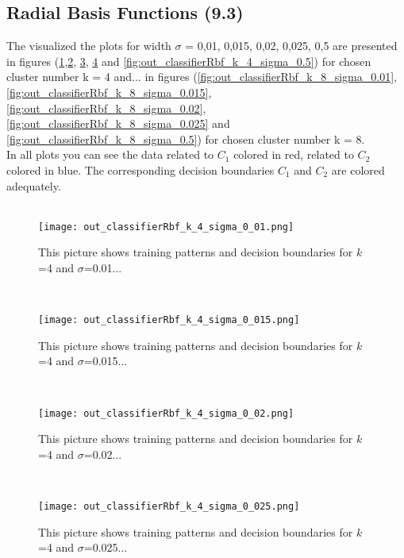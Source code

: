 \documentclass[a4paper,headings=small]{scrartcl}
\begin{document}
\subsection{Radial Basis Functions (9.3)}
The visualized the plots for width $\sigma$ = 0,01, 0,015, 0,02, 0,025, 0,5 are presented in figures (\ref{fig:out_classifierRbf_k_4_sigma_0.01},\ref{fig:out_classifierRbf_k_4_sigma_0.015}, \ref{fig:out_classifierRbf_k_4_sigma_0.02}, \ref{fig:out_classifierRbf_k_4_sigma_0.025} and \ref{fig:out_classifierRbf_k_4_sigma_0.5}) for chosen cluster number k = 4 and... in figures (\ref{fig:out_classifierRbf_k_8_sigma_0.01},\ref{fig:out_classifierRbf_k_8_sigma_0.015}, \ref{fig:out_classifierRbf_k_8_sigma_0.02}, \ref{fig:out_classifierRbf_k_8_sigma_0.025} and \ref{fig:out_classifierRbf_k_8_sigma_0.5}) for chosen cluster number k = 8.\\
In all plots you can see the data related to $C_1$ colored in red, related to $C_2$ colored in blue. The corresponding decision boundaries $C_1$ and $C_2$ are colored adequately.\\ 
\\
\begin{figure}[htbp]
\centering
\texttt{[image: out\_classifierRbf\_k\_4\_sigma\_0\_01.png]}
\caption{This picture shows training patterns and decision boundaries for $k$=4 and $\sigma$=0.01...}
\label{fig:out_classifierRbf_k_4_sigma_0.01}
\end{figure}
\\
\begin{figure}[htbp]
\centering
\texttt{[image: out\_classifierRbf\_k\_4\_sigma\_0\_015.png]}
\caption{This picture shows training patterns and decision boundaries for $k$=4 and $\sigma$=0.015...}
\label{fig:out_classifierRbf_k_4_sigma_0.015}
\end{figure}
\\
\begin{figure}[htbp]
\centering
\texttt{[image: out\_classifierRbf\_k\_4\_sigma\_0\_02.png]}
\caption{This picture shows training patterns and decision boundaries for $k$=4 and $\sigma$=0.02...}
\label{fig:out_classifierRbf_k_4_sigma_0.02}
\end{figure}
\\
\begin{figure}[htbp]
\centering
\texttt{[image: out\_classifierRbf\_k\_4\_sigma\_0\_025.png]}
\caption{This picture shows training patterns and decision boundaries for $k$=4 and $\sigma$=0.025...}
\label{fig:out_classifierRbf_k_4_sigma_0.025}
\end{figure}
\end{document}
